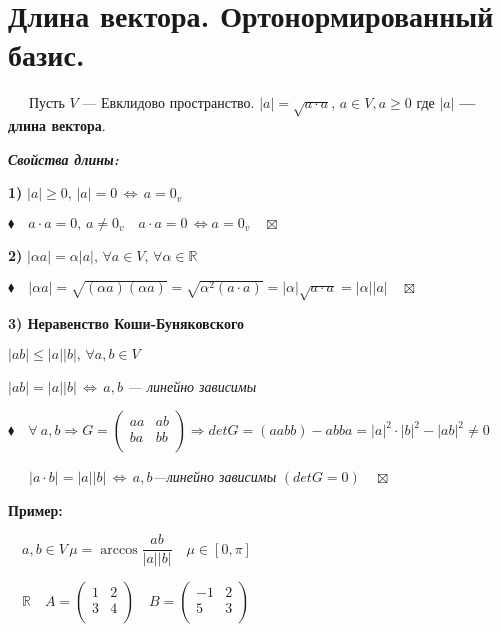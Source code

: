 \documentclass[a4paper, 12pt]{report}
\begin{document}
	
	
	
	
	
	
	
	
	
	\section{Длина вектора. Ортонормированный базис.}
	$\quad\;\ $Пусть $V$ --- Евклидово пространство. $|a|=\sqrt{a \cdot a}, \, a \in V, a \geqslant 0$ где $|a|$\textbf{ --- длина вектора}.
	\par \bigskip
	\textit{\textbf{Свойства длины:}}
	
	\textbf{1) }$|a|\ge 0, \, |a|=0 \, \Longleftrightarrow \, a=0_v$
	\par \bigskip
	$\blacklozenge \quad a \cdot a=0, \, a \ne 0_v \quad a \cdot a =0 \, \Longleftrightarrow a=0_v\quad\boxtimes$
	\par \bigskip
	\textbf{2) }$|\alpha a|=\alpha |a|, \, \forall a \in V, \, \forall \alpha \in \mathbb{R}$
	\par \bigskip
	$\blacklozenge \quad |\alpha a|=\sqrt{(\alpha a)(\alpha a)}=\sqrt{\alpha^2(a \cdot a)}=|\alpha|\sqrt{a\cdot a}=|\alpha||a|\quad\boxtimes$
	\par \bigskip
	\textbf{3) Неравенство Коши-Буняковского}
	
	$|ab| \le |a||b|, \, \forall a,b \in V$
	
	$|ab|=|a||b| \, \Longleftrightarrow \, a,b$\textit{ --- линейно зависимы}
	\par \bigskip
	$\blacklozenge \quad \forall\ a,b \Rightarrow G=\begin{pmatrix}
		aa&ab\\
		ba&bb\\
	\end{pmatrix} \Rightarrow detG=(aabb)-abba=|a|^2 \cdot |b|^2 - |ab|^2 \ne 0$
	
	$\quad\;\ |a \cdot b|=|a||b| \, \Longleftrightarrow \, a,b$\textit{---линейно зависимы} $(det G=0) \quad \boxtimes$
	\par \bigskip
	\textbf{Пример:}
	
	$\quad a, b \in V \, \mu=\arccos{\dfrac{ab}{|a||b|}} \quad \mu \in [0, \pi]$
	
	$\quad \mathbb{R} \quad A=\begin{pmatrix}
		1&2\\
		3&4\\
	\end{pmatrix} \quad B=\begin{pmatrix}
		-1&2\\
		5&3\\
	\end{pmatrix}$
	
\end{document}
